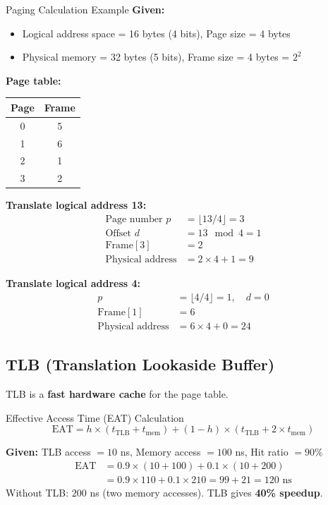 \documentclass[12pt,a4paper]{article}
\begin{document}
\begin{examplebox}{Paging Calculation Example}
\textbf{Given:}
\begin{itemize}
    \item Logical address space = 16 bytes (4 bits), Page size = 4 bytes
    \item Physical memory = 32 bytes (5 bits), Frame size = 4 bytes = $2^2$
\end{itemize}

\textbf{Page table:}
\begin{center}
\begin{tabular}{cc}
\toprule
\textbf{Page} & \textbf{Frame} \\
\midrule
0 & 5 \\
1 & 6 \\
2 & 1 \\
3 & 2 \\
\bottomrule
\end{tabular}
\end{center}

\textbf{Translate logical address 13:}
\begin{align*}
\text{Page number } p &= \lfloor 13 / 4 \rfloor = 3 \\
\text{Offset } d &= 13 \mod 4 = 1 \\
\text{Frame}[3] &= 2 \\
\text{Physical address} &= 2 \times 4 + 1 = \boxed{9}
\end{align*}

\textbf{Translate logical address 4:}
\begin{align*}
p &= \lfloor 4/4 \rfloor = 1, \quad d = 0 \\
\text{Frame}[1] &= 6 \\
\text{Physical address} &= 6 \times 4 + 0 = \boxed{24}
\end{align*}
\end{examplebox}

\subsection{TLB (Translation Lookaside Buffer)}

TLB is a \textbf{fast hardware cache} for the page table.

\begin{examplebox}{Effective Access Time (EAT) Calculation}
\[
\text{EAT} = h \times (t_{\text{TLB}} + t_{\text{mem}}) + (1-h) \times (t_{\text{TLB}} + 2 \times t_{\text{mem}})
\]

\textbf{Given:} TLB access $= 10$ ns, Memory access $= 100$ ns, Hit ratio $= 90\%$
\begin{align*}
\text{EAT} &= 0.9 \times (10 + 100) + 0.1 \times (10 + 200) \\
           &= 0.9 \times 110 + 0.1 \times 210 = 99 + 21 = \boxed{120 \text{ ns}}
\end{align*}
Without TLB: $200$ ns (two memory accesses). TLB gives \textbf{40\% speedup}.
\end{examplebox}
\end{document}
